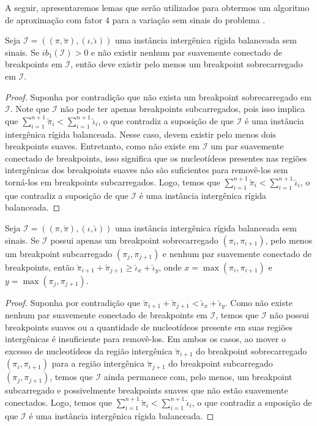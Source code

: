 A seguir, apresentaremos lemas que serão utilizados para obtermos um algoritmo de aproximação com fator $4$ para a variação sem sinais do problema \SbIRT{}.

\begin{lemma}\label{lemma:XPQZERDR}
Seja $\mathcal{I} = ((\pi,\breve\pi),(\iota,\breve\iota))$ uma instância intergênica rígida balanceada sem sinais. Se $ib_1(\mathcal{I}) > 0$ e não existir nenhum par suavemente conectado de breakpoints em $\mathcal{I}$, então deve existir pelo menos um breakpoint sobrecarregado em $\mathcal{I}$.
\end{lemma}
\begin{proof}
Suponha por contradição que não exista um breakpoint sobrecarregado em $\mathcal{I}$. Note que $\mathcal{I}$ não pode ter apenas breakpoints subcarregados, pois isso implica que $\sum_{i=1}^{n+1}\breve\pi_i < \sum_{i=1}^{n+1}\breve\iota_i$, o que contradiz a suposição de que $\mathcal{I}$ é uma instância intergênica rígida balanceada. Nesse caso, devem existir pelo menos dois breakpoints suaves. Entretanto, como não existe em  $\mathcal{I}$ um par suavemente conectado de breakpoints, isso significa que os nucleotídeos presentes nas regiões intergênicas dos breakpoints suaves não são suficientes para removê-los sem torná-los em breakpoints subcarregados. Logo, temos que $\sum_{i=1}^{n+1}\breve\pi_i < \sum_{i=1}^{n+1}\breve\iota_i$, o que contradiz a suposição de que $\mathcal{I}$ é uma instância intergênica rígida balanceada.
\end{proof}

\begin{lemma}\label{lemma:DWXIBBXO}
Seja $\mathcal{I} = ((\pi,\breve\pi),(\iota,\breve\iota))$ uma instância intergênica rígida balanceada sem sinais. Se $\mathcal{I}$ possui apenas um breakpoint sobrecarregado $(\pi_i,\pi_{i+1})$, pelo menos um breakpoint subcarregado $(\pi_j,\pi_{j+1})$ e nenhum par suavemente conectado de breakpoints, então $\breve\pi_{i+1} + \breve\pi_{j+1} \ge \breve\iota_{x} + \breve\iota_{y}$, onde $x = \max(\pi_i,\pi_{i+1})$ e $y=\max(\pi_j,\pi_{j+1})$.
\end{lemma}
\begin{proof}
Suponha por contradição que $\breve\pi_{i+1} + \breve\pi_{j+1} < \breve\iota_{x} + \breve\iota_{y}$. Como não existe nenhum par suavemente conectado de breakpoints em $\mathcal{I}$, temos que $\mathcal{I}$ não possui breakpoints suaves ou a quantidade de nucleotídeos presente em suas regiões intergênicas é insuficiente para removê-los. Em ambos os casos, ao mover o excesso de nucleotídeos da região intergênica $\breve\pi_{i+1}$ do breakpoint sobrecarregado $(\pi_i,\pi_{i+1})$ para a região intergênica $\breve\pi_{j+1}$ do breakpoint subcarregado $(\pi_j,\pi_{j+1})$, temos que $\mathcal{I}$ ainda permanece com, pelo menos, um breakpoint subcarregado e possivelmente breakpoints suaves que não estão suavemente conectados. Logo, temos que $\sum_{i=1}^{n+1}\breve\pi_i < \sum_{i=1}^{n+1}\breve\iota_i$, o que contradiz a suposição de que $\mathcal{I}$ é uma instância intergênica rígida balanceada.
\end{proof}

